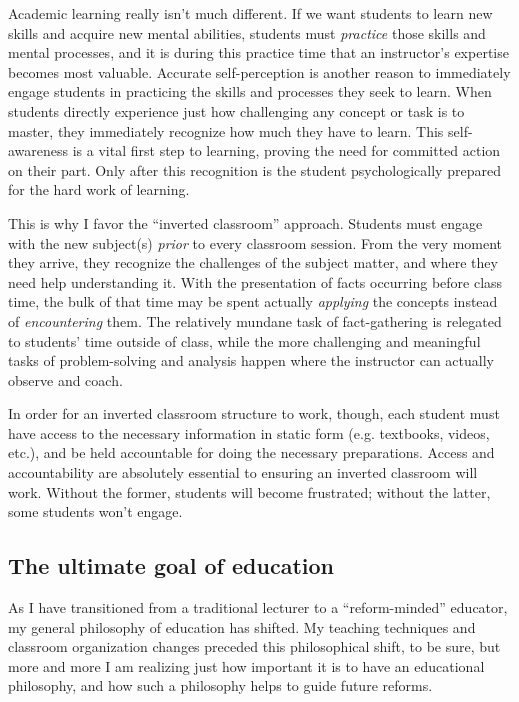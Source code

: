 Academic learning really isn't much different.  If we want students to learn new skills and acquire new mental abilities, students must \textit{practice} those skills and mental processes, and it is during this practice time that an instructor's expertise becomes most valuable.  Accurate self-perception is another reason to immediately engage students in practicing the skills and processes they seek to learn.  When students directly experience just how challenging any concept or task is to master, they immediately recognize how much they have to learn.  This self-awareness is a vital first step to learning, proving the need for committed action on their part.  Only after this recognition is the student psychologically prepared for the hard work of learning.

This is why I favor the ``inverted classroom'' approach.  Students must engage with the new subject(s) \textit{prior} to every classroom session.  From the very moment they arrive, they recognize the challenges of the subject matter, and where they need help understanding it.  With the presentation of facts occurring before class time, the bulk of that time may be spent actually \textit{applying} the concepts instead of \textit{encountering} them.  The relatively mundane task of fact-gathering is relegated to students' time outside of class, while the more challenging and meaningful tasks of problem-solving and analysis happen where the instructor can actually observe and coach.  

In order for an inverted classroom structure to work, though, each student must have access to the necessary information in static form (e.g. textbooks, videos, etc.), and be held accountable for doing the necessary preparations.  Access and accountability are absolutely essential to ensuring an inverted classroom will work.  Without the former, students will become frustrated; without the latter, some students won't engage.






\filbreak
\subsection{The ultimate goal of education}

As I have transitioned from a traditional lecturer to a ``reform-minded'' educator, my general philosophy of education has shifted.  My teaching techniques and classroom organization changes preceded this philosophical shift, to be sure, but more and more I am realizing just how important it is to have an educational philosophy, and how such a philosophy helps to guide future reforms.

